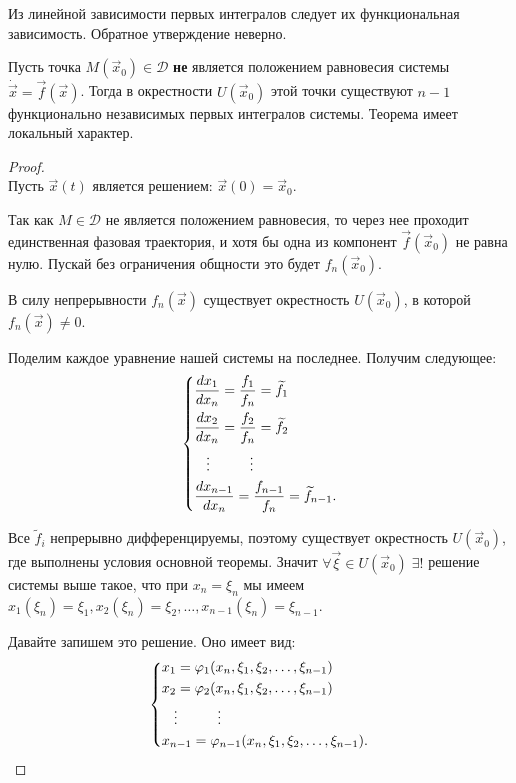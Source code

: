	\begin{remark}
		Из линейной зависимости первых интегралов следует их функциональная зависимость. Обратное утверждение неверно.
	\end{remark}
	
	\begin{theorem}
		Пусть точка $M(\vec{x}_0) \in \mathscr{D}$ \textbf{не} является положением равновесия системы $\dot{\vec{x}} = \vec{f}(\vec{x})$. Тогда в окрестности $U(\vec{x}_0)$ этой точки существуют $n - 1$ функционально независимых первых интегралов системы. Теорема имеет локальный характер.
	\end{theorem}

	\begin{proof}
		\hfill\\
		Пусть $\vec{x}(t)$ является решением: $\vec{x}(0) = \vec{x}_0$.
		
		Так как $M \in \mathscr{D}$ не является положением равновесия, то через нее проходит единственная фазовая траектория, и хотя бы одна из компонент $\vec{f}(\vec{x}_0)$ не равна нулю. Пускай без ограничения общности это будет $f_n(\vec{x}_0)$. 
		
		В силу непрерывности $f_n(\vec{x})$ существует окрестность $U(\vec{x}_0)$, в которой $f_n(\vec{x}) \neq 0$.
		
		Поделим каждое уравнение нашей системы на последнее. Получим следующее:
		\begin{equation}
			\begin{cases*}
				\dfrac{dx_1}{dx_n} = \dfrac{f_1}{f_n} = \widetilde{f_1} \\
				\dfrac{dx_2}{dx_n} = \dfrac{f_2}{f_n} = \widetilde{f_2} \\
				\hspace{3mm}\vdots \hspace{10mm} \vdots \\
				\dfrac{dx_{n-1}}{dx_n} = \dfrac{f_{n-1}}{f_n} = \widetilde{f}_{n-1}.
			\end{cases*}
		\end{equation}
	
	Все $\widetilde{f}_i$ непрерывно дифференцируемы, поэтому существует окрестность $U(\vec{x}_0)$, где выполнены условия основной теоремы. Значит $\forall \vec{\xi} \in U(\vec{x}_0)\;\exists !$ решение системы выше такое, что при $x_n = \xi_n$ мы имеем $x_1(\xi_n) = \xi_1, x_2(\xi_n) = \xi_2, \ldots, x_{n-1}(\xi_n) = \xi_{n-1}$.

	Давайте запишем это решение. Оно имеет вид:
	\begin{equation}\label{x_from_phi_system}
		\begin{cases*}
			x_1 = \varphi_1(x_n, \xi_1, \xi_2, \ldots, \xi_{n-1}) \\
			x_2 = \varphi_2(x_n, \xi_1, \xi_2, \ldots, \xi_{n-1}) \\
			\hspace{3mm}\vdots \hspace{10mm} \vdots \\
			x_{n-1} = \varphi_{n-1}(x_n, \xi_1, \xi_2, \ldots, \xi_{n-1}).
		\end{cases*}
	\end{equation}


\end{proof}
